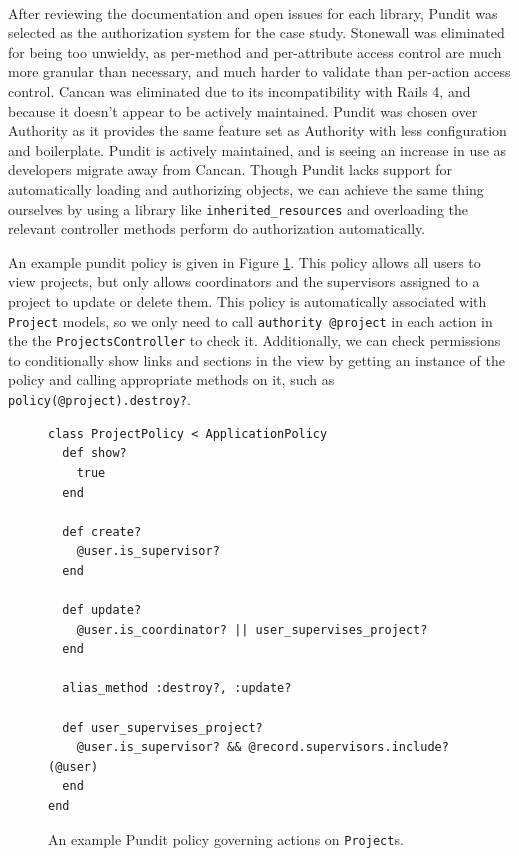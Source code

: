 \documentclass[document.tex]{subfiles}
\begin{document}
\par \noindent \\ After reviewing the documentation and open issues for each library, Pundit was selected as the authorization system for the case study. Stonewall was eliminated for being too unwieldy, as per-method and per-attribute access control are much more granular than necessary, and much harder to validate than per-action access control. Cancan was eliminated due to its incompatibility with Rails 4, and because it doesn’t appear to be actively maintained. Pundit was chosen over Authority as it provides the same feature set as Authority with less configuration and boilerplate. Pundit is actively maintained, and is seeing an increase in use as developers migrate away from Cancan. Though Pundit lacks support for automatically loading and authorizing objects, we can achieve the same thing ourselves by using a library like \verb!inherited_resources! and overloading the relevant controller methods perform do authorization automatically.

An example pundit policy is given in Figure \ref{fig:4ys-pundit-policy}. This policy allows all users to view projects, but only allows coordinators and the supervisors assigned to a project to update or delete them. This policy is automatically associated with \verb!Project! models, so we only need to call
\verb!authority @project! in each action in the the \verb!ProjectsController! to check it. Additionally, we can check permissions to conditionally show links and sections in the view by getting an instance of the policy and calling appropriate methods on it, such as \verb!policy(@project).destroy?!.

\begin{figure}[!ht]
  \begin{lstlisting}
class ProjectPolicy < ApplicationPolicy
  def show?
    true
  end

  def create?
    @user.is_supervisor?
  end

  def update?
    @user.is_coordinator? || user_supervises_project?
  end

  alias_method :destroy?, :update?

  def user_supervises_project?
    @user.is_supervisor? && @record.supervisors.include?(@user)
  end
end
  \end{lstlisting}
  \cprotect \caption{An example Pundit policy governing actions on \verb!Project!s.}
  \label{fig:4ys-pundit-policy}
\end{figure}
\end{document}
